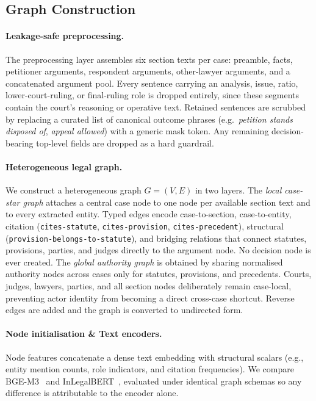 \documentclass[runningheads]{llncs}
\begin{document}
\subsection{Graph Construction}
\label{subsec:pipeline-graph}

\paragraph{Leakage-safe preprocessing.}
The preprocessing layer assembles six section texts per case: preamble, facts, petitioner arguments, respondent arguments, other-lawyer arguments, and a concatenated argument pool. Every sentence carrying an analysis, issue, ratio, lower-court-ruling, or final-ruling role is dropped entirely, since these segments contain the court's reasoning or operative text. Retained sentences are scrubbed by replacing a curated list of canonical outcome phrases (e.g.\ \emph{petition stands disposed of}, \emph{appeal allowed}) with a generic mask token. Any remaining decision-bearing top-level fields are dropped as a hard guardrail. 

\paragraph{Heterogeneous legal graph.}
We construct a heterogeneous graph $G=(V,E)$ in two layers. The \emph{local case-star graph} attaches a central case node to one node per available section text and to every extracted entity. Typed edges encode case-to-section, case-to-entity, citation (\texttt{cites-statute}, \texttt{cites-provision}, \texttt{cites-precedent}), structural (\texttt{provision-belongs-to-statute}), and bridging relations that connect statutes, provisions, parties, and judges directly to the argument node. No decision node is ever created. The \emph{global authority graph} is obtained by sharing normalised authority nodes across cases only for statutes, provisions, and precedents. Courts, judges, lawyers, parties, and all section nodes deliberately remain case-local, preventing actor identity from becoming a direct cross-case shortcut. Reverse edges are added and the graph is converted to undirected form.

\paragraph{Node initialisation \& Text encoders.}
Node features concatenate a dense text embedding with structural scalars (e.g., entity mention counts, role indicators, and citation frequencies). We compare BGE-M3~\cite{chen2024bgem3} and InLegalBERT~\cite{paul2023inlegalbert}, evaluated under identical graph schemas so any difference is attributable to the encoder alone.
\end{document}

